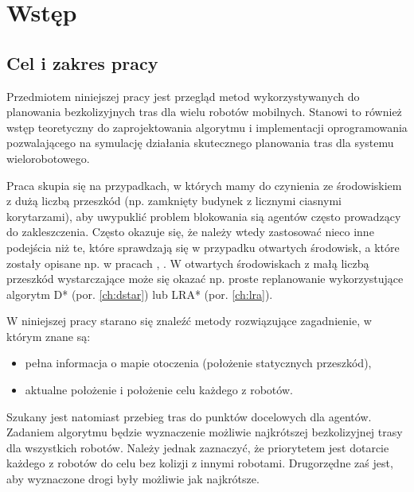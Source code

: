 \chapter{Wstęp}
\label{ch:wstep}

\section{Cel i zakres pracy}
Przedmiotem niniejszej pracy jest przegląd metod wykorzystywanych do planowania bezkolizyjnych tras dla wielu robotów mobilnych.
Stanowi to również wstęp teoretyczny do zaprojektowania algorytmu i implementacji oprogramowania pozwalającego na symulację działania skutecznego planowania tras dla systemu wielorobotowego.

Praca skupia się na przypadkach, w których mamy do czynienia ze środowiskiem z dużą liczbą przeszkód (np. zamknięty budynek z licznymi ciasnymi korytarzami), aby uwypuklić  problem blokowania sią agentów często prowadzący do zakleszczenia. Często okazuje się, że należy wtedy zastosować nieco inne podejścia niż te, które sprawdzają się w przypadku otwartych środowisk, a które zostały opisane np. w pracach \cite{roszkowska}, \cite{siemiatkowska}.
W otwartych środowiskach z małą liczbą przeszkód wystarczające może się okazać np. proste replanowanie wykorzystujące algorytm D* (por. \ref{ch:dstar}) lub LRA* (por. \ref{ch:lra}).

W niniejszej pracy starano się znaleźć metody rozwiązujące zagadnienie, w którym znane są:
\vspace{-1em}
\begin{itemize}[noitemsep]
	\item pełna informacja o mapie otoczenia (położenie statycznych przeszkód),
	\item aktualne położenie i położenie celu każdego z robotów.
\end{itemize}
Szukany jest natomiast przebieg tras do punktów docelowych dla agentów. Zadaniem algorytmu będzie wyznaczenie możliwie najkrótszej bezkolizyjnej trasy dla wszystkich robotów. Należy jednak zaznaczyć, że priorytetem jest dotarcie każdego z robotów do celu bez kolizji z innymi robotami. Drugorzędne zaś jest, aby wyznaczone drogi były możliwie jak najkrótsze.

\clearpage
